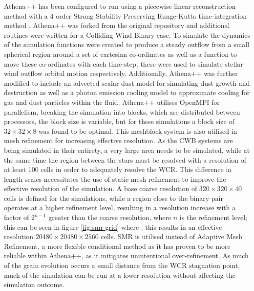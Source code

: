 Athena++ has been configured to run using a piecewise linear reconstruction method with a 4 order Strong Stability Preserving Runge-Kutta time-integration method \parencite{spiteriNewClassOptimal2002}.
Athena++ was forked from the original repository and additional routines were written for a Colliding Wind Binary case.
To simulate the dynamics of the simulation functions were created to produce a steady outflow from a small spherical region around a set of cartesian co-ordinates as well as a function to move these co-ordinates with each time-step; these were used to simulate stellar wind outflow orbital motion respectively.
Additionally, Athena++ was further modified to include an advected scalar dust model for simulating dust growth and destruction as well as a photon emission cooling model to approximate cooling for gas and dust particles within the fluid.
Athena++ utilises OpenMPI for parallelism, breaking the simulation into blocks, which are distributed between processors, the block size is variable, but for these simulations a block size of $32\times 32 \times 8$ was found to be optimal.
This meshblock system is also utilised in mesh refinement for increasing effective resolution.
As the CWB systems are being simulated in their entirety, a very large area needs to be simulated, while at the same time the region between the stars must be resolved with a resolution of at least 100 cells in order to adequately resolve the WCR.
This difference in length scales necessitates the use of static mesh refinement to improve the effective resolution of the simulation.
A base coarse resolution of $320 \times 320 \times 40$ cells is defined for the simulations, while a region close to the binary pair operates at a higher refinement level, resulting in a resolution increase with a factor of $2^{n-1}$ greater than the coarse resolution, where $n$ is the refinement level; this can be seen in figure \ref{fig:smr-grid} where .
this results in an effective resolution $20480 \times 20480 \times 2560$ cells.
SMR is utilised instead of Adaptive Mesh Refinement, a more flexible conditional method as it has proven to be more reliable within Athena++, as it mitigates unintentional over-refinement.
As much of the grain evolution occurs a small distance from the WCR stagnation point, much of the simulation can be run at a lower resolution without affecting the simulation outcome.

